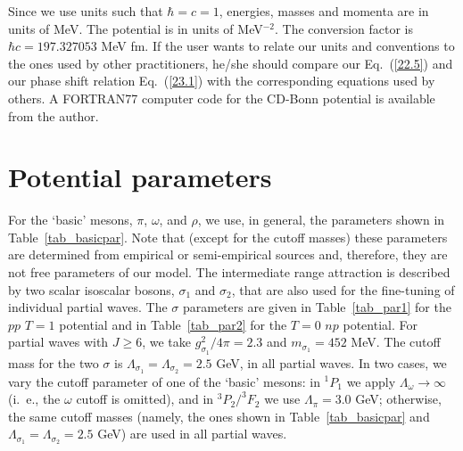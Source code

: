 Since we use units such that $\hbar=c=1$,
energies, masses and momenta are in units of MeV.
The potential is in units of MeV$^{-2}$.
 The conversion factor is $\hbar c 
=197.327053$ MeV fm.  If the user wants to relate our units 
and conventions to the ones used by other practitioners, he/she should 
compare our Eq.~(\ref{22.5}) and our phase shift relation Eq.~(\ref{23.1}) 
with the corresponding equations used by others.
A FORTRAN77 computer code for the CD-Bonn potential is available from the
author.


\section{Potential parameters}
For the `basic' mesons, $\pi$, $\omega$, and $\rho$, we use, in
general, the parameters shown in Table~\ref{tab_basicpar}.
Note that (except for the cutoff masses) these parameters
are determined from empirical or semi-empirical
sources and, therefore, they are not free parameters of our model.
The intermediate range attraction is described by
two scalar isoscalar bosons, $\sigma_1$ and $\sigma_2$,
that are also used for the fine-tuning of individual partial
waves.  The $\sigma$ parameters are given 
in Table~\ref{tab_par1} for the $pp$ $T=1$ potential 
and in Table~\ref{tab_par2} for the $T=0$ $np$ potential. 
For partial waves with $J\geq 6$, we take 
$g^2_{\sigma_1}/4\pi = 2.3$ 
and $m_{\sigma_1} = 452$ MeV.
The cutoff mass for the two $\sigma$ is 
$\Lambda_{\sigma_1}
=\Lambda_{\sigma_2} = 2.5$ GeV, 
in all partial waves.
In two cases, we vary the cutoff
parameter of one of the `basic' mesons:
in $^1P_1$ we apply $\Lambda_\omega \rightarrow \infty$ (i.~e., the
$\omega$ cutoff is omitted), and in $^3P_2/^3F_2$ we use
$\Lambda_\pi = 3.0$ GeV; otherwise, the same cutoff masses
(namely, the ones shown in Table~\ref{tab_basicpar} and
$\Lambda_{\sigma_1}
=\Lambda_{\sigma_2} = 2.5$ GeV) are used in all partial waves.

